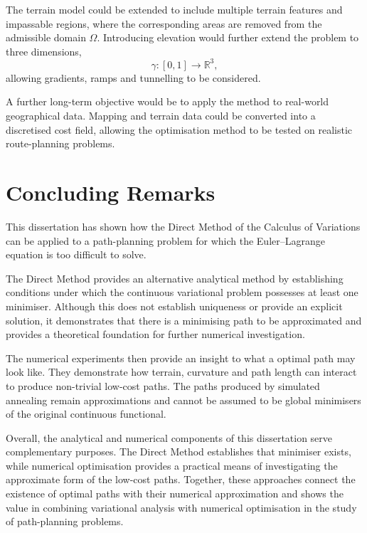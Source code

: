 The terrain model could be extended to include multiple terrain
features and impassable regions, where the corresponding areas are
removed from the admissible domain $\Omega$. Introducing elevation
would further extend the problem to three dimensions,
\[
\gamma : [0,1] \rightarrow \mathbb{R}^3,
\]
allowing gradients, ramps and tunnelling to be considered.

A further long-term objective would be to apply the method to
real-world geographical data. Mapping and terrain data could be
converted into a discretised cost field, allowing the optimisation
method to be tested on realistic route-planning problems.

\section{Concluding Remarks}

This dissertation has shown how the Direct Method of the Calculus of Variations can be applied to a path-planning problem for which the Euler--Lagrange equation is too difficult to solve. 

The Direct Method provides an alternative analytical method by establishing conditions under which the continuous variational problem possesses at least one minimiser. Although this does not establish uniqueness or provide an explicit solution, it demonstrates that there is a minimising path to be approximated and provides a theoretical foundation for further numerical investigation.

The numerical experiments then provide an insight to what a optimal path may look like. They demonstrate how terrain, curvature and path length can interact to produce non-trivial low-cost paths. The paths produced by simulated annealing remain approximations and cannot be assumed to be global minimisers of the original continuous functional.

Overall, the analytical and numerical components of this dissertation serve complementary purposes. The Direct Method establishes that minimiser exists, while numerical optimisation provides a practical means of investigating the approximate form of the low-cost paths. Together, these approaches connect the existence of optimal paths with their numerical approximation and shows the value in combining variational analysis with numerical optimisation in the study of path-planning problems.
